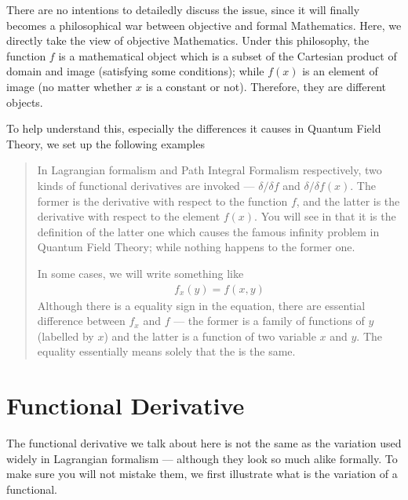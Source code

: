 \documentclass[letterpaper,10pt,english]{sphinxmanual}
\begin{document}
There are no intentions to detailedly discuss the issue, since it will finally becomes a philosophical war between objective and formal Mathematics. Here, we directly take the view of objective Mathematics. Under this philosophy, the function \(f\) is a mathematical object which is a subset of the Cartesian product of domain and image (satisfying some conditions); while \(f(x)\) is an element of image (no matter whether \(x\) is a constant or not). Therefore, they are  different objects.

To help understand this, especially the differences it causes in Quantum Field Theory, we set up the following examples
\begin{quote}

 In Lagrangian formalism and Path Integral Formalism respectively, two kinds of functional derivatives are invoked --- \(\delta/\delta f\) and \(\delta/\delta f(x)\). The former is the derivative with respect to the function \(f\), and the latter is the derivative with respect to the element \(f(x)\). You will see in that it is the definition of the latter one which causes the famous infinity problem in Quantum Field Theory; while nothing happens to the former one.

 In some cases, we will write something like
\begin{equation*}
\begin{split}f_x(y)=f(x,y)\end{split}
\end{equation*}
Although there is a equality sign in the equation, there are essential difference between \(f_x\) and \(f\) --- the former is a family of functions of \(y\) (labelled by \(x\)) and the latter is a function of two variable \(x\) and \(y\). The equality essentially means solely that the  is the same.
\end{quote}


\section{Functional Derivative}
\label{\detokenize{ms_func_deriv::doc}}\label{\detokenize{ms_func_deriv:functional-derivative}}
The functional derivative we talk about here is not the same as the variation used widely in Lagrangian formalism --- although they look so much alike formally. To make sure you will not mistake them, we first illustrate what is the variation of a functional.
\end{document}
